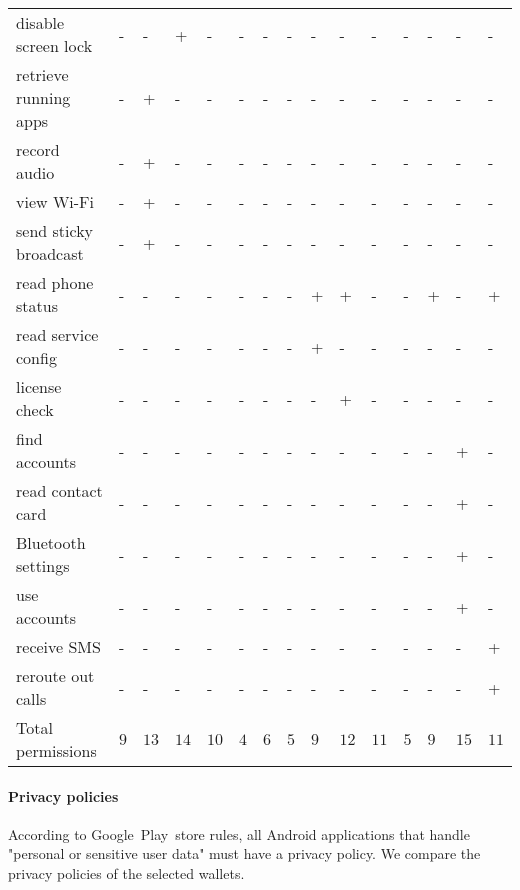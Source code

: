 \begin{table*}
\begin{tabular}{ | l | l l l l l l l | l l l l l l l |}
		disable screen lock & - & - & + & - & - & - & - & - & - & - & - & - & - & - \\
		retrieve running apps & - & + & - & - & - & - & - & - & - & - & - & - & - & - \\
		record audio & - & + & - & - & - & - & - & - & - & - & - & - & - & - \\
		view Wi-Fi & - & + & - & - & - & - & - & - & - & - & - & - & - & - \\
		send sticky broadcast & - & + & - & - & - & - & - & - & - & - & - & - & - & - \\
		read phone status & - & - & - & - & - & - & - & + & + & - & - & + & - & + \\
		read service config & - & - & - & - & - & - & - & + & - & - & - & - & - & - \\
		license check & - & - & - & - & - & - & - & - & + & - & - & - & - & - \\
		find accounts & - & - & - & - & - & - & - & - & - & - & - & - & + & - \\
		read contact card & - & - & - & - & - & - & - & - & - & - & - & - & + & - \\
		Bluetooth settings & - & - & - & - & - & - & - & - & - & - & - & - & + & - \\
		use accounts & - & - & - & - & - & - & - & - & - & - & - & - & + & - \\
		receive SMS & - & - & - & - & - & - & - & - & - & - & - & - & - & + \\
		reroute out calls & - & - & - & - & - & - & - & - & - & - & - & - & - & + \\
		\hline
		Total permissions & $9$ & $13$ & $14$ & $10$ & $4$ & $6$ & $5$ & $9$ & $12$ & $11$ & $5$ & $9$ & $15$ & $11$ \\
		\hline
	\end{tabular}
	\label{tab:permissions}
\end{table*}


\paragraph{Privacy policies}
According to Google~Play~store rules, all Android applications that handle "personal or sensitive user data" must have a privacy policy.
We compare the privacy policies of the selected wallets.

